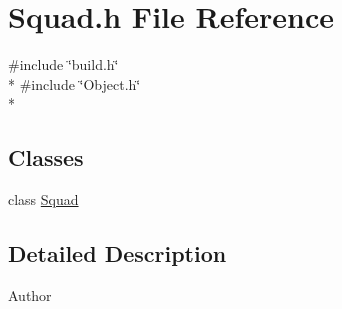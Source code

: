 \section{Squad.\-h File Reference}
\label{_squad_8h}
{\ttfamily \#include \char`\"{}build.\-h\char`\"{}}\\*
{\ttfamily \#include \char`\"{}Object.\-h\char`\"{}}\\*
\subsection*{Classes}
\begin{DoxyCompactItemize}
\item 
class \hyperlink{class_squad}{Squad}
\end{DoxyCompactItemize}


\subsection{Detailed Description}
\begin{DoxyAuthor}{Author}

\end{DoxyAuthor}
